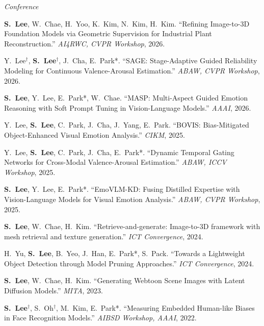 \documentclass[10pt,a4paper]{article}
\begin{document}
\textit{Conference}
\begin{enumerate}[leftmargin=*,labelsep=6pt,itemsep=3pt,label={[C\arabic*]}]
  \item \textbf{S.\ Lee}, W.\ Chae, H.\ Yoo, K.\ Kim, N.\ Kim, H.\ Kim.
    ``Refining Image-to-3D Foundation Models via Geometric Supervision for
    Industrial Plant Reconstruction.'' \textit{AI4RWC, CVPR Workshop}, 2026.
  \item Y.\ Lee$^\dagger$, \textbf{S.\ Lee}$^\dagger$, J.\ Cha, E.\ Park*.
    ``SAGE: Stage-Adaptive Guided Reliability Modeling for Continuous
    Valence-Arousal Estimation.'' \textit{ABAW, CVPR Workshop}, 2026.
  \item \textbf{S.\ Lee}, Y.\ Lee, E.\ Park*, W.\ Chae.
    ``MASP: Multi-Aspect Guided Emotion Reasoning with Soft Prompt Tuning in
    Vision-Language Models.'' \textit{AAAI}, 2026.
  \item Y.\ Lee, \textbf{S.\ Lee}, C.\ Park, J.\ Cha, J.\ Yang, E.\ Park.
    ``BOVIS: Bias-Mitigated Object-Enhanced Visual Emotion Analysis.''
    \textit{CIKM}, 2025.
  \item Y.\ Lee, \textbf{S.\ Lee}, C.\ Park, J.\ Cha, E.\ Park*.
    ``Dynamic Temporal Gating Networks for Cross-Modal Valence-Arousal
    Estimation.'' \textit{ABAW, ICCV Workshop}, 2025.
  \item \textbf{S.\ Lee}, Y.\ Lee, E.\ Park*.
    ``EmoVLM-KD: Fusing Distilled Expertise with Vision-Language Models for
    Visual Emotion Analysis.'' \textit{ABAW, CVPR Workshop}, 2025.
  \item \textbf{S.\ Lee}, W.\ Chae, H.\ Kim.
    ``Retrieve-and-generate: Image-to-3D framework with mesh retrieval and
    texture generation.'' \textit{ICT Convergence}, 2024.
  \item H.\ Yu, \textbf{S.\ Lee}, B.\ Yeo, J.\ Han, E.\ Park*, S.\ Pack.
    ``Towards a Lightweight Object Detection through Model Pruning
    Approaches.'' \textit{ICT Convergence}, 2024.
  \item \textbf{S.\ Lee}, W.\ Chae, H.\ Kim.
    ``Generating Webtoon Scene Images with Latent Diffusion Models.''
    \textit{MITA}, 2023.
  \item \textbf{S.\ Lee}$^\dagger$, S.\ Oh$^\dagger$, M.\ Kim, E.\ Park*.
    ``Measuring Embedded Human-like Biases in Face Recognition Models.''
    \textit{AIBSD Workshop, AAAI}, 2022.
\end{enumerate}
\end{document}
